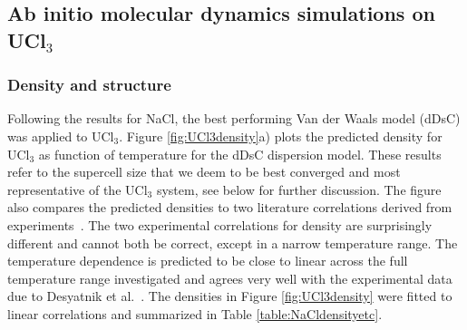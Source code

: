 \documentclass[titlepage=firstiscover,11pt,fleqn,headheight=14pt,footheight=40.8pt]{scrreprt}
\begin{document}

\subsection{Ab initio molecular dynamics simulations on UCl$_3$}
\subsubsection{Density and structure}
Following the results for NaCl, the best performing Van der Waals model (dDsC) was applied to UCl$_3$. %
Figure \ref{fig:UCl3density}a) plots the predicted density for UCl$_3$ as function of temperature for the dDsC dispersion model. 
These results refer to the supercell size that we deem to be best converged and most representative of the UCl$_3$ system, see below for further discussion. 
The figure also compares the predicted densities to two literature correlations derived from experiments~\cite{Janz1988,Desyatnik}.
The two experimental correlations for density are surprisingly different and cannot both be correct, except in a narrow temperature range. 
 The temperature dependence is predicted to be close to linear across the full temperature range investigated and agrees very well with the experimental data due to Desyatnik et al.~\cite{Desyatnik}. %
 The densities in Figure \ref{fig:UCl3density} were fitted to linear correlations and summarized in Table \ref{table:NaCldensityetc}. 
 
\end{document}
